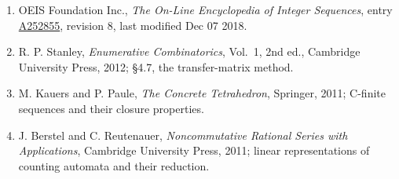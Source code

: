 \documentclass[11pt]{article}
\theoremstyle{definition}
\begin{document}
\begin{enumerate}

\item OEIS Foundation Inc., \emph{The On-Line Encyclopedia of Integer Sequences}, entry \href{https://oeis.org/A252855}{A252855}, revision 8, last modified Dec 07 2018.

\item R. P. Stanley, \emph{Enumerative Combinatorics}, Vol.~1, 2nd ed., Cambridge University Press, 2012; \S4.7, the transfer-matrix method.

\item M. Kauers and P. Paule, \emph{The Concrete Tetrahedron}, Springer, 2011; C-finite sequences and their closure properties.

\item J. Berstel and C. Reutenauer, \emph{Noncommutative Rational Series with Applications}, Cambridge University Press, 2011; linear representations of counting automata and their reduction.

\end{enumerate}
\end{document}
